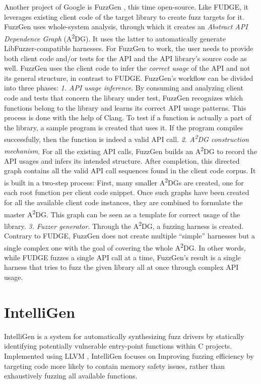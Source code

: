 \documentclass[
  a4paper,
]{scrreprt}
\theoremstyle{definition}
\theoremstyle{remark}
\begin{document}
Another project of Google is FuzzGen \autocite{fuzzgen}, this time
open-source. Like FUDGE, it leverages existing client code of the target
library to create fuzz targets for it. FuzzGen uses whole-system
analysis, through which it creates an \emph{Abstract API Dependence
Graph} (A\textsuperscript{2}DG). It uses the latter to automatically
generate LibFuzzer-compatible harnesses. For FuzzGen to work, the user
needs to provide both client code and/or tests for the API and the API
library's source code as well. FuzzGen uses the client code to infer the
\emph{correct usage} of the API and not its general structure, in
contrast to FUDGE. FuzzGen's workflow can be divided into three phases:
\emph{1. API usage inference}. By consuming and analyzing client code
and tests that concern the library under test, FuzzGen recognizes which
functions belong to the library and learns its correct API usage
patterns. This process is done with the help of Clang. To test if a
function is actually a part of the library, a sample program is created
that uses it. If the program compiles successfully, then the function is
indeed a valid API call. \emph{2. A\textsuperscript{2}DG construction
mechanism}. For all the existing API calls, FuzzGen builds an
A\textsuperscript{2}DG to record the API usages and infers its intended
structure. After completion, this directed graph contains all the valid
API call sequences found in the client code corpus. It is built in a
two-step process: First, many smaller A\textsuperscript{2}DGs are
created, one for each root function per client code snippet. Once such
graphs have been created for all the available client code instances,
they are combined to formulate the master A\textsuperscript{2}DG. This
graph can be seen as a template for correct usage of the library.
\emph{3. Fuzzer generator}. Through the A\textsuperscript{2}DG, a
fuzzing harness is created. Contrary to FUDGE, FuzzGen does not create
multiple ``simple'' harnesses but a single complex one with the goal of
covering the whole A\textsuperscript{2}DG. In other words, while FUDGE
fuzzes a single API call at a time, FuzzGen's result is a single harness
that tries to fuzz the given library all at once through complex API
usage.

\section{IntelliGen}\label{intelligen}

IntelliGen \autocite{zhang2021} is a system for automatically
synthesizing fuzz drivers by statically identifying potentially
vulnerable entry-point functions within C projects. Implemented using
LLVM \autocite{llvm}, IntelliGen focuses on Improving fuzzing efficiency
by targeting code more likely to contain memory safety issues, rather
than exhaustively fuzzing all available functions.
\end{document}
